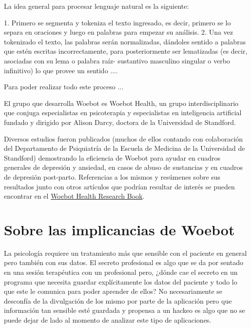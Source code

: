 \documentclass[11pt]{article}
\begin{document}
La idea general para procesar lenguaje natural es la siguiente: 

1. Primero se segmenta y tokeniza el texto ingresado, es decir, primero se lo separa en oraciones y luego en palabras para empezar su análisis. 
2. Una vez tokenizado el texto, las palabras serán normalizadas, dándoles sentido a palabras que estén escritas incorrectamente, para 
posteriormente ser lematizadas (es decir, asociadas con su lema o palabra raíz- sustantivo masculino singular o verbo infinitivo)
lo que provee un sentido   
....

Para poder realizar todo este proceso ...



El grupo que desarrolla Woebot es Woebot Health, un grupo interdisciplinario que conjuga especialistas en psicoterapia y especialistas en inteligencia artificial fundado y dirigido por Alison Darcy, doctora de la Universidad de Standford.

Diversos estudios fueron publicados (muchos de ellos contando con colaboración del Departamento de Psiquiatría de la Escuela de Medicina de la Universidad de Standford) demostrando la eficiencia de Woebot para ayudar en cuadros generales de depresión y ansiedad, en casos de abuso de sustancias y en cuadros de depresión post-parto.
Referencias a los mismos y resúmenes sobre sus resultados 
junto con otros artículos que podrían resultar de interés
se pueden encontrar en el \href{https://woebothealth.com/img/2021/05/Woebot-Health-Research-Bibliography_May-2021-1-1.pdf}{Woebot Health Research Book}.

\section{Sobre las implicancias de Woebot}

La psicología requiere un tratamiento más que sensible
con el paciente en general pero también con sus datos.
El secreto profesional es algo que se da por sentado en
una sesión terapéutica con un profesional pero, ¿dónde cae
el secreto en un programa que necesita guardar explícitamente
los datos del paciente y todo lo que este le comunica
para poder aprender de ellos? No necesariamente se desconfía
de la divulgación de los mismo por parte de la aplicación
pero que información tan sensible esté guardada y propensa a
un hackeo es algo que no se puede dejar de lado al momento
de analizar este tipo de aplicaciones.
\end{document}
